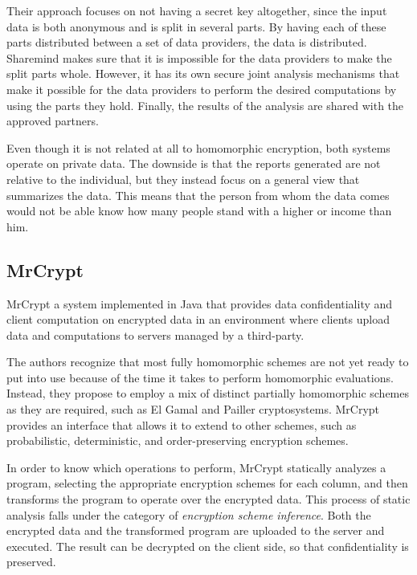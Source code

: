 Their approach focuses on not having a secret key altogether, since the input data is both anonymous and is split in several parts. By having each of these parts distributed between a set of data providers, the data is distributed. Sharemind makes sure that it is impossible for the data providers to make the split parts whole. However, it has its own secure joint analysis mechanisms that make it possible for the data providers to perform the desired computations by using the parts they hold. Finally, the results of the analysis are shared with the approved partners.

Even though it is not related at all to homomorphic encryption, both systems operate on private data. The downside is that the reports generated are not relative to the individual, but they instead focus on a general view that summarizes the data. This means that the person from whom the data comes would not be able know how many people stand with a higher or income than him.

\subsection{MrCrypt}
MrCrypt \cite{Tetali:2013:MSA:2544173.2509554} a system implemented in Java that provides data confidentiality and client computation on encrypted data in an environment where clients upload data and computations to servers managed by a third-party.

The authors recognize that most fully homomorphic schemes are not yet ready to put into use because of the time it takes to perform homomorphic evaluations. Instead, they propose to employ a mix of distinct partially homomorphic schemes as they are required, such as El Gamal \cite{ElGamal:1985:PKC:19478.19480} and Pailler \cite{Paillier:1999:PCB:1756123.1756146} cryptosystems. MrCrypt provides an interface that allows it to extend to other schemes, such as probabilistic, deterministic, and order-preserving encryption schemes. 

In order to know which operations to perform, MrCrypt statically analyzes a program, selecting the appropriate encryption schemes for each column, and then transforms the program to operate over the encrypted data. This process of static analysis falls under the category of \emph{encryption scheme inference}. Both the encrypted data and the transformed program are uploaded to the server and executed. The result can be decrypted on the client side, so that confidentiality is preserved.

